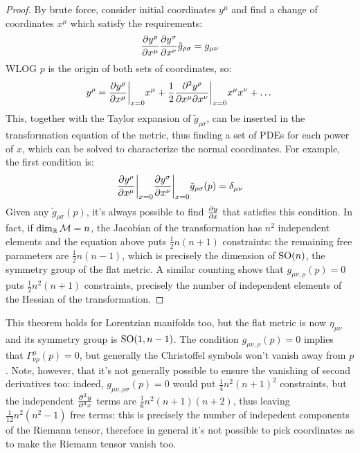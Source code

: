 \begin{proofbox}
  \begin{proof}
    By brute force, consider initial coordinates $ y^\mu $ and find a change of coordinates $ x^\mu $ which satisfy the requirements:
    \begin{equation*}
      \frac{\partial y^\rho}{\partial x^\mu} \frac{\partial y^\sigma}{\partial x^\nu} \tilde{g}_{\rho \sigma} = g_{\mu \nu}
    \end{equation*}
    WLOG $ p $ is the origin of both sets of coordinates, so:
    \begin{equation*}
      y^\rho = \frac{\partial y^\rho}{\partial x^\mu}\bigg\vert_{x = 0} x^\mu + \frac{1}{2} \frac{\partial^2 y^\rho}{\partial x^\mu \partial x^\nu}\bigg\vert_{x = 0} x^\mu x^\nu + \dots
    \end{equation*}
    This, together with the Taylor expansion of $ \tilde{g}_{\rho \sigma} $, can be inserted in the transformation equation of the metric, thus finding a set of PDEs for each power of $ x $, which can be solved to characterize the normal coordinates. For example, the first condition is:
    \begin{equation*}
      \frac{\partial y^\rho}{\partial x^\mu}\bigg\vert_{x = 0} \frac{\partial y^\sigma}{\partial x^\nu}\bigg\vert_{x = 0} \tilde{g}_{\rho \sigma}(p) = \delta_{\mu \nu}
    \end{equation*}
    Given any $ \tilde{g}_{\rho \sigma}(p) $, it's always possible to find $ \frac{\partial y}{\partial x} $ that satisfies this condition. In fact, if $ \dim_{\mathbb{R}} \mathcal{M} = n $, the Jacobian of the transformation has $ n^2 $ independent elements and the equation above puts $ \frac{1}{2} n (n + 1) $ constraints: the remaining free parameters are $ \frac{1}{2} n (n - 1) $, which is precisely the dimension of $ \mathrm{SO}(n) $, the symmetry group of the flat metric.
    A similar counting shows that $ g_{\mu \nu , \rho}(p) = 0 $ puts $ \frac{1}{2} n^2 (n + 1) $ constraints, precisely the number of independent elements of the Hessian of the transformation.
  \end{proof}
\end{proofbox}

This theorem holds for Lorentzian manifolds too, but the flat metric is now $ \eta_{\mu \nu} $ and its symmetry group is $ \mathrm{SO}(1, n-1) $. The condition $ g_{\mu \nu , \rho}(p) = 0 $ implies that $ \Gamma^\mu_{\nu \rho}(p) = 0 $, but generally the Christoffel symbols won't vanish away from $ p $. Note, however, that it's not generally possible to ensure the vanishing of second derivatives too: indeed, $ g_{\mu \nu , \rho \sigma}(p) = 0 $ would put $ \frac{1}{4} n^2 (n + 1)^2 $ constraints, but the independent $ \frac{\partial^3 y}{\partial^3 x} $ terms are $ \frac{1}{6} n^2 (n+1) (n+2) $, thus leaving $ \frac{1}{12} n^2 (n^2 - 1) $ free terms: this is precisely the number of indepedent components of the Riemann tensor, therefore in general it's not possible to pick coordinates as to make the Riemann tensor vanish too.

